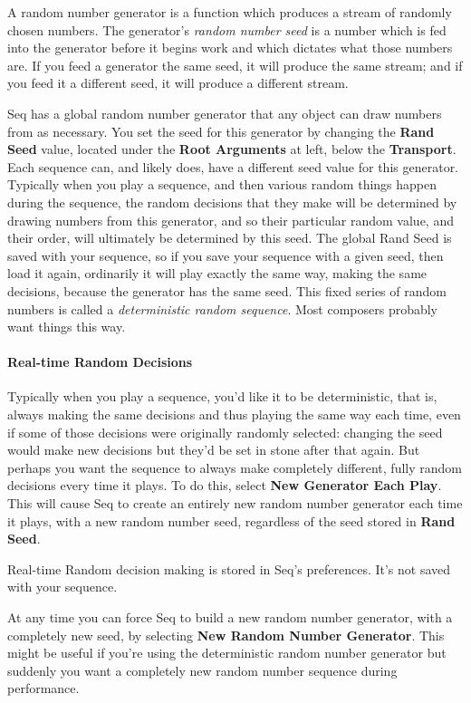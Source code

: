 \documentclass[twoside,10pt]{article}
\begin{document}
A  random number generator is a function which produces a stream of randomly chosen numbers.  The generator's {\it random number seed} is a number which is fed into the generator before it begins work and which dictates what those numbers are.  If you feed a generator the same seed, it will produce the same stream; and if you feed it a different seed, it will produce a different stream.

Seq has a global random number generator that any object can draw numbers from as necessary.  You set the seed for this generator by changing the {\bf Rand Seed} value, located under the {\bf Root Arguments} at left, below the {\bf Transport}.  Each sequence can, and likely does, have a different seed value for this generator.  Typically when you play a sequence, and then various random things happen during the sequence, the random decisions that they make will be determined by drawing numbers from this generator, and so their particular random value, and their order, will ultimately be determined by this seed.  The global Rand Seed is saved with your sequence, so if you save your sequence with a given seed, then load it again, ordinarily it will play exactly the same way, making the same decisions, because the generator has the same seed.  This fixed series of random numbers is called a {\it deterministic random sequence}.  Most composers probably want things this way.

\paragraph{Real-time Random Decisions}
Typically when you play a sequence, you'd like it to be deterministic, that is, always making the same decisions and thus playing the same way each time, even if some of those decisions were originally randomly selected: changing the seed would make new decisions but they'd be set in stone after that again.  But perhaps you want the sequence to always make completely different, fully random decisions every time it plays.  To do this, select {\bf New Generator Each Play}.  This will cause Seq to create an entirely new random number generator each time it plays, with a new random number seed, regardless of the seed stored in {\bf Rand Seed}.

Real-time Random decision making is stored in Seq's preferences.  It's not saved with your sequence.

At any time you can force Seq to build a new random number generator, with a completely new seed, by selecting {\bf New Random Number Generator}.  This might be useful if you're using the deterministic random number generator but suddenly you want a completely new random number sequence during performance.
\end{document}

